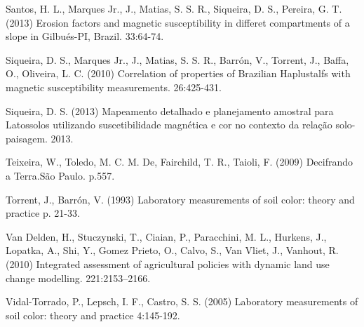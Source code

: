 \begin{footnotesize}
\begin{thebibliography}{99}
Santos, H. L., Marques Jr., J., Matias, S. S. R., Siqueira, D. S., Pereira, G. T. (2013)
\newblock Erosion factors and magnetic susceptibility in differet compartments of a slope in Gilbués-PI, Brazil.
 33:64-74.




Siqueira, D. S., Marques Jr., J., Matias, S. S. R., Barrón, V., Torrent, J., Baffa, O., Oliveira, L. C.  (2010)
\newblock Correlation of properties of Brazilian Haplustalfs with magnetic susceptibility measurements.
 26:425-431.




Siqueira, D. S. (2013)
\newblock Mapeamento detalhado e planejamento amostral para Latossolos utilizando suscetibilidade magnética e cor no contexto da relação solo-paisagem.
 2013.




Teixeira, W., Toledo, M. C. M. De, Fairchild, T. R., Taioli, F. (2009)
\newblock Decifrando a Terra.São Paulo.
 p.557.




Torrent, J., Barrón, V. (1993)
\newblock Laboratory measurements of soil color: theory and practice
 p. 21-33.




Van Delden, H., Stuczynski, T., Ciaian, P., Paracchini, M. L., Hurkens, J., Lopatka, A., Shi, Y., Gomez Prieto, O., Calvo, S., Van Vliet, J., Vanhout, R. (2010)
\newblock Integrated assessment of agricultural policies with dynamic land use change modelling.
 221:2153–2166.




Vidal-Torrado, P., Lepsch, I. F., Castro, S. S. (2005)
\newblock Laboratory measurements of soil color: theory and practice
 4:145-192.





\end{thebibliography}
\end{footnotesize}
